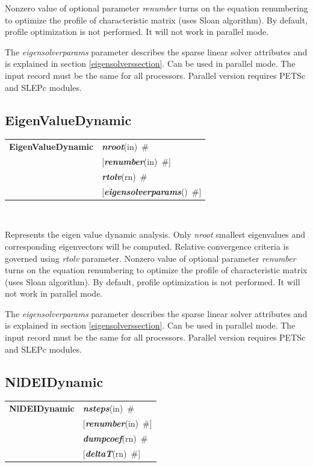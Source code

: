\documentclass[a4paper]{article}
\makeatletter
\newcommand{\param}[1]{{\em #1}}
\newcommand{\keywordnotype}[1]{\mbox{{\it{\bf{#1}}}}}
\newcommand{\keyword}[2]{\mbox{{\keywordnotype{#1}\tiny (#2)}}}
\newcommand{\entKeywordInst}[1]{\mbox{{\bf{{#1}}}}}
\newcommand{\field}[2]{\mbox{\keyword{#1}{#2}~\#}}
\newcommand{\optField}[2]{\mbox{[\field{#1}{#2}]}}
\newcommand{\Pmode}[1]{{\sffamily #1}}
\newenvironment{record}[1][]{\begin{tabular}{|ll}}{\end{tabular}\\}
\newcommand{\recentry}[2]{{#1}&{#2}\\}
\newcounter{rcc}
\newenvironment{record}[1][\textwidth]{\setcounter{rcc}{0}\begin{tabular*}{#1}{|ll@{\extracolsep{\fill}}r}}{\end{tabular*}\\}
\newcommand{\recentry}[2]{\ifthenelse{\value{rcc}>0}{&$\backslash$ \\}{\setcounter{rcc}{1}}{#1}&{#2}}
\makeatother
\begin{document}
Nonzero value of optional parameter \param{renumber} turns on the
equation renumbering to optimize the profile of characteristic matrix
(uses Sloan algorithm). By default, profile optimization is not
performed. It will not work in parallel mode.

The \param{eigensolverparams} parameter describes the sparse
linear solver attributes and is explained in section \ref{eigensolverssection}.
\Pmode{Can be used in parallel mode. The input record must be the same
for all processors. Parallel version requires PETSc and SLEPc modules.}

\subsection{EigenValueDynamic}
\label{EigenValueDynamic}
\begin{record}
\recentry{\entKeywordInst{EigenValueDynamic}}{\field{nroot}{in}}
\recentry{}{\optField{renumber}{in}}
\recentry{}{\field{rtolv}{rn}} \recentry{}{\optField{eigensolverparams}{}}
\end{record}

Represents the eigen value dynamic analysis.
Only \param{nroot} smallest eigenvalues and corresponding
eigenvectors will be computed. Relative convergence criteria is
governed using \param{rtolv} parameter.
Nonzero value of optional parameter \param{renumber} turns on the
equation renumbering to optimize the profile of characteristic matrix
(uses Sloan algorithm). By default, profile optimization is not
performed. It will not work in parallel mode.

The \param{eigensolverparams} parameter describes the sparse
linear solver attributes and is explained in section \ref{eigensolverssection}.
\Pmode{Can be used in parallel mode. The input record must be the same
for all processors. Parallel version requires PETSc and SLEPc modules.}


\subsection{NlDEIDynamic}
\label{NlDEIDynamic}
\begin{record}
\recentry{\entKeywordInst{NlDEIDynamic}}{\field{nsteps}{in}}
\recentry{}{\optField{renumber}{in}}
\recentry{}{\field{dumpcoef}{rn}} \recentry{}{\optField{deltaT}{rn}}
\end{record}
\end{document}
